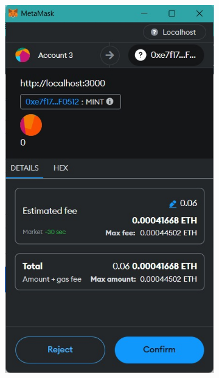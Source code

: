    \begin{figure} [H] \centering
  \centering
  \begin{subfigure}{0.45\textwidth}
      \includegraphics[scale=0.32]{gambar/confirm_create.jpg}
      \caption{}
      \label{fig:payipfs-a}
  \end{subfigure}
  \hspace{5pt}
  \begin{subfigure}{0.45\textwidth}

\end{subfigure}
\end{figure}
